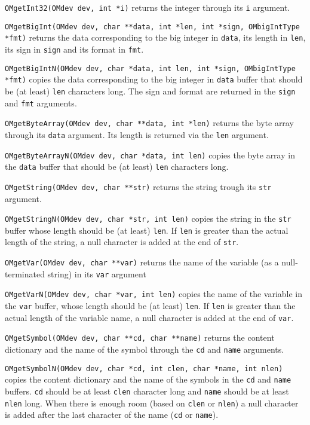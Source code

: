 \documentclass{article}
\begin{document}
\verb+OMgetInt32(OMdev dev, int *i)+ returns the integer through its {\tt i}
argument. 

\verb+OMgetBigInt(OMdev dev, char **data, int *len, int *sign, OMbigIntType *fmt)+
returns the data corresponding to the big integer in {\tt data}, its length
in {\tt len}, its sign in {\tt sign} and its format in {\tt fmt}.

\verb+OMgetBigIntN(OMdev dev, char *data, int len, int *sign, OMbigIntType *fmt)+ 
copies the data corresponding to the big integer in {\tt data} buffer that
should be (at least) {\tt len} characters long. The sign and format are
returned in the {\tt sign} and {\tt fmt} arguments.

\verb+OMgetByteArray(OMdev dev, char **data, int *len)+ returns the byte
array through its {\tt data} argument. Its length is returned via the 
{\tt len} argument.

\verb+OMgetByteArrayN(OMdev dev, char *data, int len)+ copies the byte array
in the {\tt data} buffer that should be (at least) {\tt len} characters
long. 

\verb+OMgetString(OMdev dev, char **str)+ returns the string trough its 
{\tt str} argument.

\verb+OMgetStringN(OMdev dev, char *str, int len)+ copies the string
in the {\tt str} buffer whose length should be (at least) {\tt len}.
If {\tt len} is greater than the actual length of the string, a null
character is added at the end of {\tt str}.

\verb+OMgetVar(OMdev dev, char **var)+ returns the name of the
variable (as a null-terminated string) in its {\tt var} argument

\verb+OMgetVarN(OMdev dev, char *var, int len)+ copies the name of the
variable in the {\tt var} buffer, whose length should be (at least) 
{\tt len}. 
If {\tt len} is greater than the actual length of the variable name, a null 
character is added at the end of {\tt var}.

\verb+OMgetSymbol(OMdev dev, char **cd, char **name)+ returns the content
dictionary and the name of the symbol through the {\tt cd} and {\tt name}
arguments. 

\verb+OMgetSymbolN(OMdev dev, char *cd, int clen, char *name, int nlen)+ 
copies the content dictionary and the name of the symbols in the {\tt cd} and
{\tt name} buffers. {\tt cd} should be at least {\tt clen} character long and
{\tt name} should be at least {\tt nlen} long. When there is enough room
(based on {\tt clen} or {\tt nlen}) a null character is added after the last
character of the name ({\tt cd} or {\tt name}).
\end{document}
